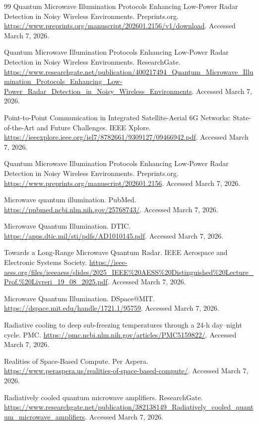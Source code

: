 \documentclass[11pt,a4paper]{article}
\begin{document}
\begin{thebibliography}{99}
 Quantum Microwave Illumination Protocols Enhancing Low-Power Radar Detection in Noisy Wireless Environments. Preprints.org. \url{https://www.preprints.org/manuscript/202601.2156/v1/download}. Accessed March 7, 2026.

 Quantum Microwave Illumination Protocols Enhancing Low-Power Radar Detection in Noisy Wireless Environments. ResearchGate. \url{https://www.researchgate.net/publication/400217494_Quantum_Microwave_Illumination_Protocols_Enhancing_Low-Power_Radar_Detection_in_Noisy_Wireless_Environments}. Accessed March 7, 2026.

 Point-to-Point Communication in Integrated Satellite-Aerial 6G Networks: State-of-the-Art and Future Challenges. IEEE Xplore. \url{https://ieeexplore.ieee.org/iel7/8782661/9309127/09466942.pdf}. Accessed March 7, 2026.

 Quantum Microwave Illumination Protocols Enhancing Low-Power Radar Detection in Noisy Wireless Environments. Preprints.org. \url{https://www.preprints.org/manuscript/202601.2156}. Accessed March 7, 2026.

 Microwave quantum illumination. PubMed. \url{https://pubmed.ncbi.nlm.nih.gov/25768743/}. Accessed March 7, 2026.

 Microwave Quantum Illumination. DTIC. \url{https://apps.dtic.mil/sti/pdfs/AD1010145.pdf}. Accessed March 7, 2026.

 Towards a Long-Range Microwave Quantum Radar. IEEE Aerospace and Electronic Systems Society. \url{https://ieee-aess.org/files/ieeeaess/slides/2025_IEEE\%20AESS\%20Distinguished\%20Lecture_Prof.\%20Livreri_19_08_2025.pdf}. Accessed March 7, 2026.

 Microwave Quantum Illumination. DSpace@MIT. \url{https://dspace.mit.edu/handle/1721.1/95759}. Accessed March 7, 2026.

 Radiative cooling to deep sub-freezing temperatures through a 24-h day--night cycle. PMC. \url{https://pmc.ncbi.nlm.nih.gov/articles/PMC5159822/}. Accessed March 7, 2026.

 Realities of Space-Based Compute. Per Aspera. \url{https://www.peraspera.us/realities-of-space-based-compute/}. Accessed March 7, 2026.

 Radiatively cooled quantum microwave amplifiers. ResearchGate. \url{https://www.researchgate.net/publication/382138149_Radiatively_cooled_quantum_microwave_amplifiers}. Accessed March 7, 2026.


\end{thebibliography}
\end{document}
